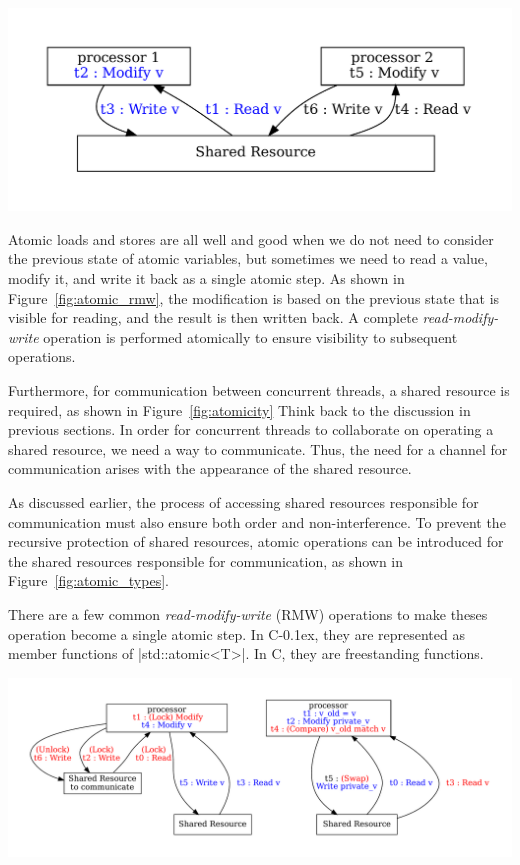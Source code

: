 \documentclass[fontsize=10pt, oneside]{scrartcl}
\newcommand{\cplusplus}[1]{C\kern-0.1ex\raisebox{0.15ex}{\texttt{++}}}
\newcommand{\clang}[1]{C}
\newcommand{\fig}[1]{Figure~\ref{#1}}
\newcommand{\introduce}[1]{\textit{#1}}
\begin{document}
\includegraphics[keepaspectratio, width=0.6\linewidth]{images/atomic_rmw}
\label{fig:atomic_rmw}

Atomic loads and stores are all well and good when we do not need to consider the previous state of atomic variables, but sometimes we need to read a value, modify it, and write it back as a single atomic step.
As shown in \fig{fig:atomic_rmw}, the modification is based on the previous state that is visible for reading, and the result is then written back.
A complete \introduce{read-modify-write} operation is performed atomically to ensure visibility to subsequent operations.
  
Furthermore, for communication between concurrent threads, a shared resource is required, as shown in \fig{fig:atomicity} 
Think back to the discussion in previous sections. 
In order for concurrent threads to collaborate on operating a shared resource, we need a way to communicate. 
Thus, the need for a channel for communication arises with the appearance of the shared resource.

As discussed earlier, the process of accessing shared resources responsible for communication must also ensure both order and non-interference. 
To prevent the recursive protection of shared resources, 
atomic operations can be introduced for the shared resources responsible for communication, as shown in \fig{fig:atomic_types}.

There are a few common \introduce{read-modify-write} (\textsc{RMW}) operations to make theses operation become a single atomic step.
In \cplusplus{}, they are represented as member functions of \cpp|std::atomic<T>|.
In \clang{}, they are freestanding functions.

\includegraphics[keepaspectratio, width=1\linewidth]{images/atomic_types}
\label{fig:atomic_types}
\end{document}
